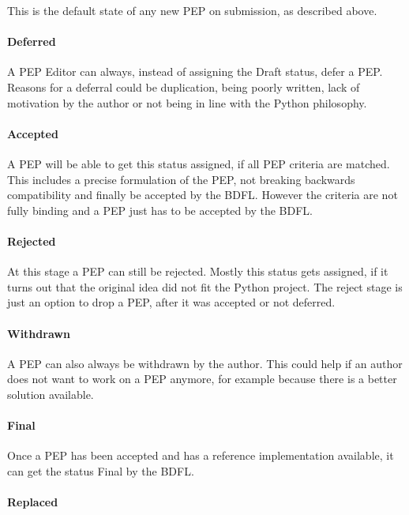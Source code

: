 This is the default state of any new \ac{PEP} on submission, as described
above.

\paragraph{Deferred}

A \ac{PEP} Editor can always, instead of assigning the Draft status, defer a
\ac{PEP}. Reasons for a deferral could be duplication, being poorly written,
lack of motivation by the author or not being in line with the Python
philosophy.

\paragraph{Accepted}

A \ac{PEP} will be able to get this status assigned, if all \ac{PEP} criteria
are matched. This includes a precise formulation of the \ac{PEP}, not breaking
backwards compatibility and finally be accepted by the \ac{BDFL}. However the
criteria are not fully binding and a \ac{PEP} just has to be accepted by the
\ac{BDFL}.

\paragraph{Rejected}

At this stage a \ac{PEP} can still be rejected. Mostly this status gets
assigned, if it turns out that the original idea did not fit the Python
project. The reject stage is just an option to drop a \ac{PEP}, after it was
accepted or not deferred.

\paragraph{Withdrawn}

A \ac{PEP} can also always be withdrawn by the author. This could help if an
author does not want to work on a \ac{PEP} anymore, for example because there
is a better solution available.

\paragraph{Final}

Once a \ac{PEP} has been accepted and has a reference implementation available,
it can get the status Final by the \ac{BDFL}.

\paragraph{Replaced}

